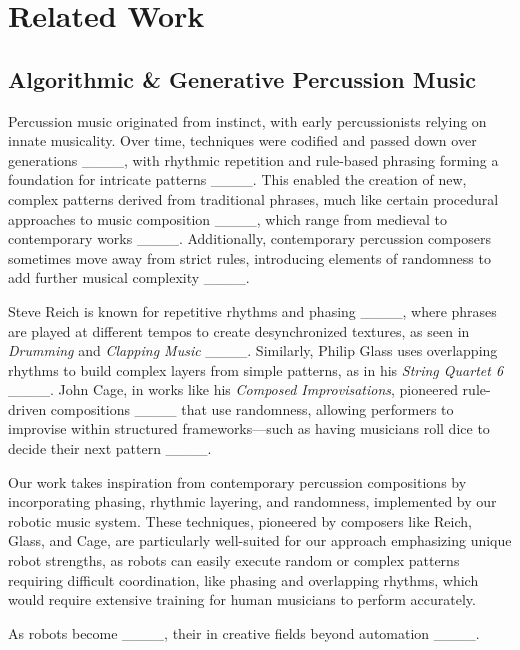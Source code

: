\section{Related Work}
\subsection{Algorithmic \& Generative Percussion Music}

Percussion music originated from instinct, with early percussionists relying on innate musicality. Over time, techniques were codified and passed down over generations ____, with rhythmic repetition and rule-based phrasing forming a foundation for intricate patterns ____. This enabled the creation of new, complex patterns derived from traditional phrases, much like certain procedural approaches to music composition ____, which range from medieval to contemporary works ____. Additionally, contemporary percussion composers sometimes move away from strict rules, introducing elements of randomness to add further musical complexity ____.

Steve Reich is known for repetitive rhythms and phasing ____, where phrases are played at different tempos to create desynchronized textures, as seen in  \textit{Drumming} and \textit{Clapping Music} ____. Similarly, Philip Glass uses overlapping rhythms to build complex layers from simple patterns, as in his \textit{String Quartet 6} ____. John Cage, in works like his \textit{Composed Improvisations}, pioneered rule-driven compositions ____ that use randomness, allowing performers to improvise within structured frameworks---such as having musicians roll dice to decide their next pattern ____.

Our work takes inspiration from contemporary percussion compositions by incorporating phasing, rhythmic layering, and randomness, implemented by our robotic music system. These techniques, pioneered by composers like Reich, Glass, and Cage, are particularly well-suited for our approach emphasizing unique robot strengths, as robots can easily execute random or complex patterns requiring difficult coordination, like phasing and overlapping rhythms, which would require extensive training for human musicians to perform accurately. 


As robots become  ____, their  in creative fields  beyond automation ____.  

